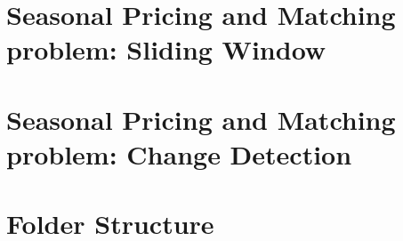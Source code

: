     \section*{Seasonal Pricing and Matching problem: Sliding Window}
    \label{sect:Seasonal Pricing and Matching problem: Sliding Window}
		
    \section*{Seasonal Pricing and Matching problem: Change Detection}
    \label{sect:Seasonal Pricing and Matching problem: Change Detection}
	
     \section*{Folder Structure}
     \label{sect:Folder Structure}
     
    \label{sect:References}
    \printbibliography[title={References}]
